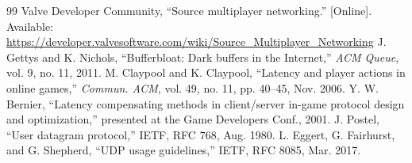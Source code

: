 \documentclass[11pt]{article}
\begin{document}
\begin{thebibliography}{99}
 Valve Developer Community, ``Source multiplayer networking.'' [Online]. Available: \url{https://developer.valvesoftware.com/wiki/Source_Multiplayer_Networking}
 J. Gettys and K. Nichols, ``Bufferbloat: Dark buffers in the Internet,'' \emph{ACM Queue}, vol. 9, no. 11, 2011.
 M. Claypool and K. Claypool, ``Latency and player actions in online games,'' \emph{Commun. ACM}, vol. 49, no. 11, pp. 40--45, Nov. 2006.
 Y. W. Bernier, ``Latency compensating methods in client/server in-game protocol design and optimization,'' presented at the Game Developers Conf., 2001.
 J. Postel, ``User datagram protocol,'' IETF, RFC 768, Aug. 1980.
 L. Eggert, G. Fairhurst, and G. Shepherd, ``UDP usage guidelines,'' IETF, RFC 8085, Mar. 2017.
\end{thebibliography}
\end{document}
